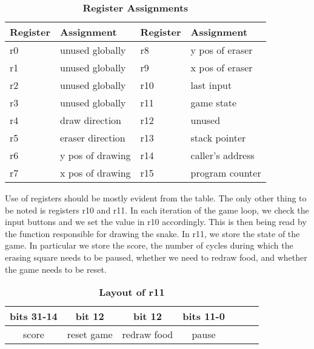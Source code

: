 \documentclass[9pt]{article}
\begin{document}
\begin{description}
    \begin{table}[h]
    \centering
    \caption*{\bf Register Assignments}
    \begin{tabular}{|l|l|l|l|}
    \hline
    {\bf Register} & {\bf Assignment} & {\bf Register} & {\bf Assignment} \\ \hline
    r0             & unused globally  & r8             & y pos of eraser  \\ \hline
    r1             & unused globally  & r9             & x pos of eraser  \\ \hline
    r2             & unused globally  & r10            & last input       \\ \hline
    r3             & unused globally  & r11            & game state       \\ \hline
    r4             & draw direction   & r12            & unused           \\ \hline
    r5             & eraser direction & r13            & stack pointer    \\ \hline
    r6             & y pos of drawing & r14            & caller's address \\ \hline
    r7             & x pos of drawing & r15            & program counter  \\ \hline
    \end{tabular}
    \end{table}
    
    Use of registers should be mostly evident from the table. The only other thing to be noted is registers r10 and r11. In each iteration of the game loop, we check the input buttons and we set the value in r10 accordingly. This is then being read by the function responsible for drawing the snake. In r11, we store the state of the game. In particular we store the score, the number of cycles during which the erasing square needs to be paused, whether we need to redraw food, and whether the game needs to be reset.
    
    \begin{table}[h]
    \centering
    \caption*{\bf Layout of r11}
    \begin{tabular}{ccccccc}
    bits 31-14 & bit 12 & bit 12 & bits 11-0 \\ \hline
    \multicolumn{1}{|c|}{score} & \multicolumn{1}{c|}{reset game} & \multicolumn{1}{c|}{redraw food} & \multicolumn{1}{c|}{pause} \\ \hline    
    
    \end{tabular}
    \end{table}


\end{description}
\end{document}
